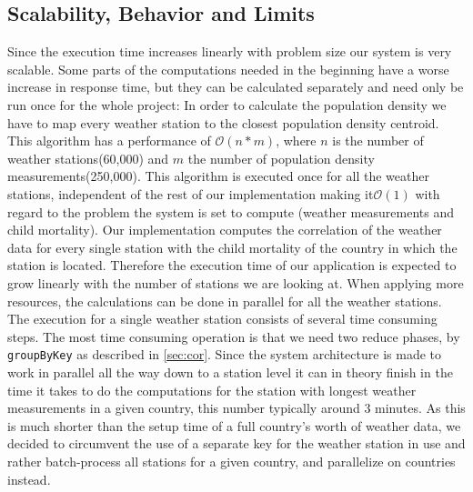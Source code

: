 \documentclass[
10pt, %
a4paper, %
oneside, %
headinclude,footinclude, %
useAMS,
usenatbib
]{mn2e}  %
\begin{document}
\subsection{Scalability, Behavior and Limits} \label{Scalability}
Since the execution time increases linearly with problem size our system is very scalable. Some parts of the computations needed in the beginning have a worse increase in response time, but they can be calculated separately and need only be run once for the whole project:  In order to calculate the population density we have to map every weather station to the closest population density centroid. This algorithm has a performance of $\mathcal O(n*m)$, where $n$ is the number of weather stations(60,000) and $m$ the number of population density measurements(250,000). This algorithm is executed once for all the weather stations, independent of the rest of our implementation making it$\mathcal O(1)$ with regard to the problem the system is set to compute (weather measurements and child mortality). Our implementation computes the correlation of the weather data for every single station with the child mortality of the country in which the station is located. Therefore the execution time of our application is expected to grow linearly with the number of stations we are looking at. When applying more resources, the calculations can be done in parallel for all the weather stations.  The execution for a single weather station consists of several time consuming steps. The most time consuming operation is that we need two reduce phases, by \texttt{groupByKey} as described in \ref{sec:cor}. Since the system architecture is made to work in parallel all the way down to a station level it can in theory finish in the time it takes to do the computations for the station with longest weather measurements in a given country, this number typically around 3 minutes. As this is much shorter than the setup time of a full country's worth of weather data, we decided to circumvent the use of a separate key for the weather station in use and rather batch-process all stations for a given country, and parallelize on countries instead.
\end{document}
